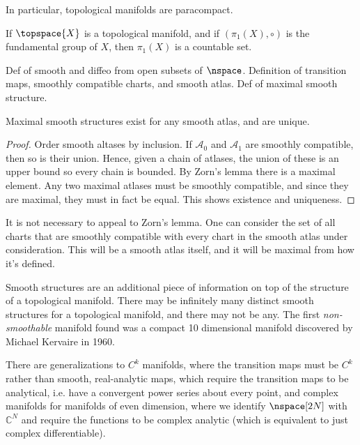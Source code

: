     In particular, topological manifolds are paracompact.
    \begin{theorem}
        If $\topspace{X}$ is a topological manifold, and if
        $(\pi_{1}(X),\circ)$ is the fundamental group of $X$, then $\pi_{1}(X)$
        is a countable set.
    \end{theorem}
    Def of smooth and diffeo from open subsets of $\nspace$. Definition of
    transition maps, smoothly compatible charts, and smooth atlas. Def of
    maximal smooth structure.
    \begin{theorem}
        Maximal smooth structures exist for any smooth atlas, and are unique.
    \end{theorem}
    \begin{proof}
        Order smooth altases by inclusion. If $\mathcal{A}_{0}$ and
        $\mathcal{A}_{1}$ are smoothly compatible, then so is their union.
        Hence, given a chain of atlases, the union of these is an upper bound
        so every chain is bounded. By Zorn's lemma there is a maximal element.
        Any two maximal atlases must be smoothly compatible, and since they are
        maximal, they must in fact be equal. This shows existence and
        uniqueness.
    \end{proof}
    It is not necessary to appeal to Zorn's lemma. One can consider the set of
    all charts that are smoothly compatible with every chart in the smooth
    atlas under consideration. This will be a smooth atlas itself, and it will
    be maximal from how it's defined.
    \par\hfill\par
    Smooth structures are an additional piece of information on top of the
    structure of a topological manifold. There may be infinitely many distinct
    smooth structures for a topological manifold, and there may not be any. The
    first \textit{non-smoothable} manifold found was a compact 10 dimensional
    manifold discovered by Michael Kervaire in 1960.
    \par\hfill\par
    There are generalizations to $C^{k}$ manifolds, where the transition maps
    must be $C^{k}$ rather than smooth, real-analytic maps, which require the
    transition maps to be analytical, i.e. have a convergent power series about
    every point, and complex manifolds for manifolds of even dimension, where
    we identify $\nspace[2N]$ with $\mathbb{C}^{N}$ and require the functions to
    be complex analytic (which is equivalent to just complex differentiable).
